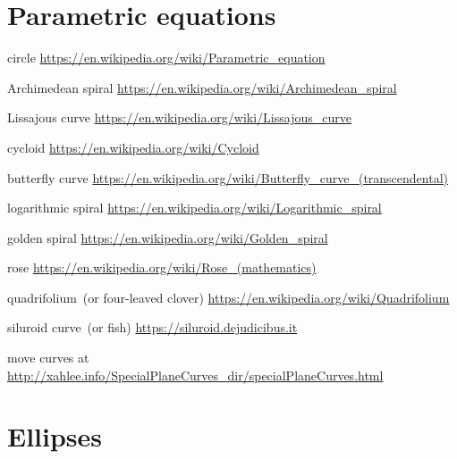 \documentclass[a4paper,oneside,12pt]{article}
\begin{document}

\section{Parametric equations}

{\color{red}
\begin{packeditem}
\item circle
  \url{https://en.wikipedia.org/wiki/Parametric_equation}

\item Archimedean spiral
  \url{https://en.wikipedia.org/wiki/Archimedean_spiral}

\item Lissajous curve
  \url{https://en.wikipedia.org/wiki/Lissajous_curve}

\item cycloid
  \url{https://en.wikipedia.org/wiki/Cycloid}

\item butterfly curve
  \url{https://en.wikipedia.org/wiki/Butterfly_curve_(transcendental)}

\item logarithmic spiral
  \url{https://en.wikipedia.org/wiki/Logarithmic_spiral}

\item golden spiral
  \url{https://en.wikipedia.org/wiki/Golden_spiral}

\item rose
  \url{https://en.wikipedia.org/wiki/Rose_(mathematics)}

\item quadrifolium~(or four-leaved clover)
  \url{https://en.wikipedia.org/wiki/Quadrifolium}

\item siluroid curve~(or fish)
  \url{https://siluroid.dejudicibus.it}

\item move curves at
  \url{http://xahlee.info/SpecialPlaneCurves_dir/specialPlaneCurves.html}
\end{packeditem}
}



\section{Ellipses}
\end{document}
